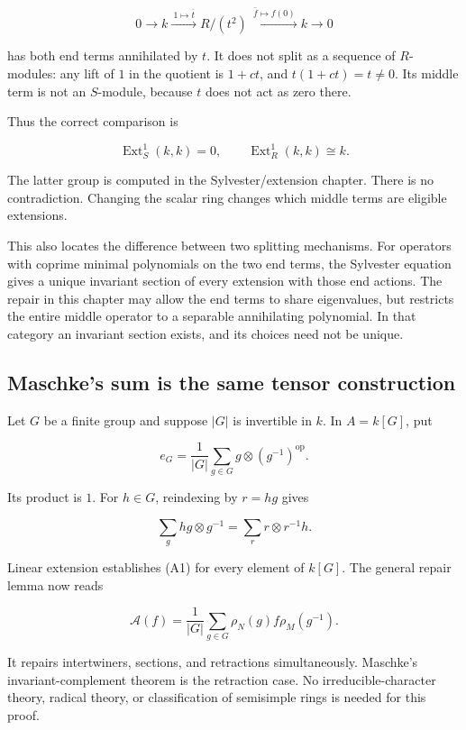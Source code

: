 \documentclass[
  11pt,
]{article}
\begin{document}
\[
0\longrightarrow k
 \xrightarrow{\ 1\mapsto\bar t\ }R/(t^2)
 \xrightarrow{\ \bar f\mapsto f(0)\ }k
 \longrightarrow0                                \tag{A14}
\]

has both end terms annihilated by \(t\). It does not split as a sequence
of \(R\)-modules: any lift of \(1\) in the quotient is \(1+ct\), and
\(t(1+ct)=t\ne0\). Its middle term is not an \(S\)-module, because \(t\)
does not act as zero there.

Thus the correct comparison is

\[
\operatorname{Ext}^1_S(k,k)=0,\qquad
\operatorname{Ext}^1_R(k,k)\cong k.
\]

The latter group is computed in the Sylvester/extension chapter. There
is no contradiction. Changing the scalar ring changes which middle terms
are eligible extensions.

This also locates the difference between two splitting mechanisms. For
operators with coprime minimal polynomials on the two end terms, the
Sylvester equation gives a unique invariant section of every extension
with those end actions. The repair in this chapter may allow the end
terms to share eigenvalues, but restricts the entire middle operator to
a separable annihilating polynomial. In that category an invariant
section exists, and its choices need not be unique.

\subsection{Maschke's sum is the same tensor
construction}\label{maschkes-sum-is-the-same-tensor-construction}

Let \(G\) be a finite group and suppose \(|G|\) is invertible in \(k\).
In \(A=k[G]\), put

\[
e_G=\frac1{|G|}\sum_{g\in G}
           g\otimes(g^{-1})^{\mathrm{op}}.          \tag{A15}
\]

Its product is \(1\). For \(h\in G\), reindexing by \(r=hg\) gives

\[
\sum_g hg\otimes g^{-1}
 =\sum_r r\otimes r^{-1}h.
\]

Linear extension establishes (A1) for every element of \(k[G]\). The
general repair lemma now reads

\[
\mathcal A(f)=\frac1{|G|}
  \sum_{g\in G}\rho_N(g)f\rho_M(g^{-1}).            \tag{A16}
\]

It repairs intertwiners, sections, and retractions simultaneously.
Maschke's invariant-complement theorem is the retraction case. No
irreducible-character theory, radical theory, or classification of
semisimple rings is needed for this proof.
\end{document}
